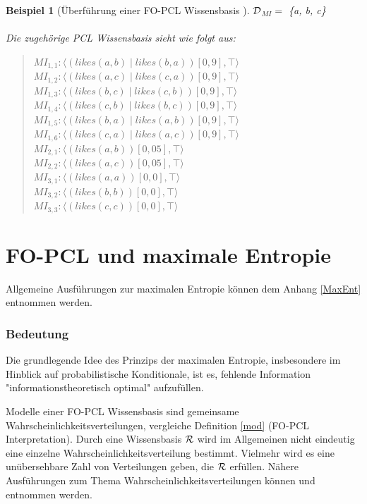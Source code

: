 \documentclass[draft]{scrreprt}
\newtheorem{Bsp}{Beispiel}[section]
\begin{document}
\begin{Bsp}[Überführung einer FO-PCL Wissensbasis ]
	$ \cal{D} $$_{MI}  =$ \{a, b, c\} \\
	\\
	Die zugehörige PCL Wissensbasis sieht wie folgt aus:
	\begin{quote}
	$ MI_{1,1}: \langle (likes(a, b) \mid likes(b, a))[0,9], \top \rangle $\\
	$ MI_{1,2} : \langle (likes(a, c) \mid likes(c, a))[0,9], \top \rangle$\\
	$ MI_{1,3}: \langle (likes(b, c) \mid likes(c, b))[0,9], \top \rangle $\\
	$ MI_{1,4} : \langle (likes(c, b) \mid likes(b, c))[0,9], \top \rangle$\\
	$ MI_{1,5} : \langle (likes(b, a) \mid likes(a, b))[0,9], \top \rangle$\\
	$ MI_{1,6} : \langle (likes(c, a) \mid likes(a, c))[0,9], \top \rangle$\\		
	$ MI_{2,1} : \langle (likes(a, b))[0,05], \top \rangle$\\
	$ MI_{2,2} : \langle (likes(a, c))[0,05], \top \rangle$\\
	$ MI_{3,1} : \langle (likes(a, a))[0,0], \top \rangle$\\
	$ MI_{3,2} : \langle (likes(b, b))[0,0], \top \rangle$\\
	$ MI_{3,3} : \langle (likes(c, c))[0,0], \top \rangle$\\

	\end{quote}

	
\end{Bsp}

\section{FO-PCL und maximale Entropie}   \label{Fo-PCL-MaxEnt}
Allgemeine Ausführungen zur maximalen Entropie können dem Anhang \ref{MaxEnt} entnommen werden.
\subsubsection{Bedeutung}

Die grundlegende Idee des Prinzips der maximalen Entropie, insbesondere im Hinblick auf probabilistische Konditionale, ist es, fehlende Information "{}informationstheoretisch optimal"{} aufzufüllen.

Modelle einer FO-PCL Wissensbasis  sind gemeinsame Wahrscheinlichkeitsverteilungen, vergleiche Definition \ref{mod} (FO-PCL Interpretation).
Durch eine Wissensbasis $ \cal R $ wird im Allgemeinen nicht eindeutig eine einzelne Wahrscheinlichkeitsverteilung bestimmt. Vielmehr wird es eine unübersehbare Zahl von Verteilungen geben, die $ \cal R $ erfüllen.
Nähere Ausführungen zum Thema Wahrscheinlichkeitsverteilungen können \cite[Anhang A, S. 437ff]{BKI08} und \cite[Kap. 5, S. 14ff]{Fis10} entnommen werden.
\end{document}
